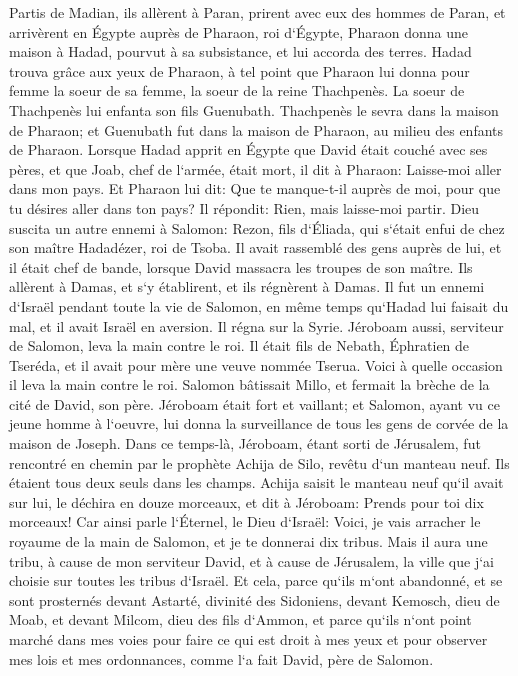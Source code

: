 \verse Partis de Madian, ils allèrent à Paran, prirent avec eux des hommes de Paran, et arrivèrent en Égypte auprès de Pharaon, roi d`Égypte, Pharaon donna une maison à Hadad, pourvut à sa subsistance, et lui accorda des terres. 
\verse Hadad trouva grâce aux yeux de Pharaon, à tel point que Pharaon lui donna pour femme la soeur de sa femme, la soeur de la reine Thachpenès. 
\verse La soeur de Thachpenès lui enfanta son fils Guenubath. Thachpenès le sevra dans la maison de Pharaon; et Guenubath fut dans la maison de Pharaon, au milieu des enfants de Pharaon. 
\verse Lorsque Hadad apprit en Égypte que David était couché avec ses pères, et que Joab, chef de l`armée, était mort, il dit à Pharaon: Laisse-moi aller dans mon pays. 
\verse Et Pharaon lui dit: Que te manque-t-il auprès de moi, pour que tu désires aller dans ton pays? Il répondit: Rien, mais laisse-moi partir. 
\verse Dieu suscita un autre ennemi à Salomon: Rezon, fils d`Éliada, qui s`était enfui de chez son maître Hadadézer, roi de Tsoba. 
\verse Il avait rassemblé des gens auprès de lui, et il était chef de bande, lorsque David massacra les troupes de son maître. Ils allèrent à Damas, et s`y établirent, et ils régnèrent à Damas. 
\verse Il fut un ennemi d`Israël pendant toute la vie de Salomon, en même temps qu`Hadad lui faisait du mal, et il avait Israël en aversion. Il régna sur la Syrie. 
\verse Jéroboam aussi, serviteur de Salomon, leva la main contre le roi. Il était fils de Nebath, Éphratien de Tseréda, et il avait pour mère une veuve nommée Tserua. 
\verse Voici à quelle occasion il leva la main contre le roi. Salomon bâtissait Millo, et fermait la brèche de la cité de David, son père. 
\verse Jéroboam était fort et vaillant; et Salomon, ayant vu ce jeune homme à l`oeuvre, lui donna la surveillance de tous les gens de corvée de la maison de Joseph. 
\verse Dans ce temps-là, Jéroboam, étant sorti de Jérusalem, fut rencontré en chemin par le prophète Achija de Silo, revêtu d`un manteau neuf. Ils étaient tous deux seuls dans les champs. 
\verse Achija saisit le manteau neuf qu`il avait sur lui, le déchira en douze morceaux, 
\verse et dit à Jéroboam: Prends pour toi dix morceaux! Car ainsi parle l`Éternel, le Dieu d`Israël: Voici, je vais arracher le royaume de la main de Salomon, et je te donnerai dix tribus. 
\verse Mais il aura une tribu, à cause de mon serviteur David, et à cause de Jérusalem, la ville que j`ai choisie sur toutes les tribus d`Israël. 
\verse Et cela, parce qu`ils m`ont abandonné, et se sont prosternés devant Astarté, divinité des Sidoniens, devant Kemosch, dieu de Moab, et devant Milcom, dieu des fils d`Ammon, et parce qu`ils n`ont point marché dans mes voies pour faire ce qui est droit à mes yeux et pour observer mes lois et mes ordonnances, comme l`a fait David, père de Salomon. 
